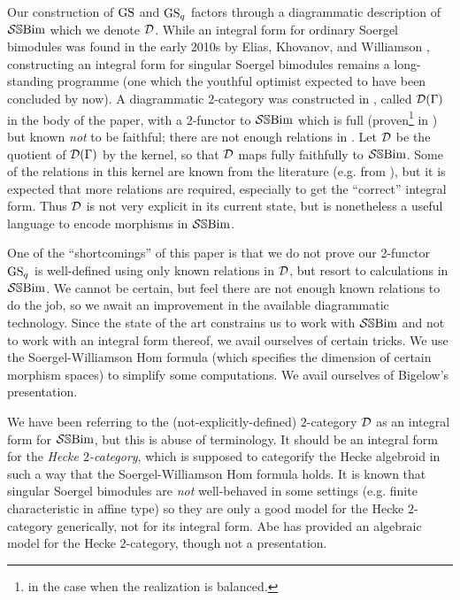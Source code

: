 Our construction of $\operatorname{GS}$ and $\operatorname{GS}_q$ factors through a diagrammatic description of $\mathcal{S}\mathbb{S}\text{Bim}$ which we denote $\mathcal{D}$. While an integral form for ordinary Soergel bimodules was found in the early 2010s by Elias, Khovanov, and Williamson \cite{EKho, ECathedral, EWGr4sb}, constructing an integral form for singular Soergel bimodules remains a long-standing programme (one which the youthful optimist expected to have been concluded by now). 
A diagrammatic $2$-category was constructed in \cite{EWSFrob}, called $\mathcal{D}(\Gamma)$ in the body of the paper, with a 2-functor to $\mathcal{S}\mathbb{S}\text{Bim}$ which is full (proven\footnote{in the case when the realization is balanced.}  in \cite{EKLP}) but known \emph{not} to be faithful; there are not enough relations in \cite{EWSFrob}. Let $\mathcal{D}$ be the quotient of $\mathcal{D}(\Gamma)$ by the kernel, so that $\mathcal{D}$ maps fully faithfully to $\mathcal{S}\mathbb{S}\text{Bim}$. Some of the relations in this kernel are known from the literature (e.g. from \cite{ECathedral, ELosev}), but it is expected that more relations are required, especially to get the ``correct'' integral form. Thus $\mathcal{D}$ is not very explicit in its current state, but is nonetheless a useful language to encode morphisms in $\mathcal{S}\mathbb{S}\text{Bim}$.

One of the ``shortcomings'' of this paper is that we do not prove our 2-functor $\operatorname{GS}_q$ is well-defined using only known relations in $\mathcal{D}$, but resort to calculations in $\mathcal{S}\mathbb{S}\text{Bim}$. We cannot be certain, but feel there are not enough known relations to do the job, so we await an improvement in the available diagrammatic technology. Since the state of the art constrains us to work with $\mathcal{S}\mathbb{S}\text{Bim}$ and not to work with an integral form thereof, we avail ourselves of certain tricks. We use the Soergel-Williamson Hom formula (which specifies the dimension of certain morphism spaces) to simplify some computations. We avail ourselves of Bigelow's presentation.

We have been referring to the (not-explicitly-defined) $2$-category $\mathcal{D}$ as an integral form for $\mathcal{S}\mathbb{S}\text{Bim}$, but this is abuse of terminology. It should be an integral form for the \emph{Hecke $2$-category}, which is supposed to categorify the Hecke algebroid in such a way that the Soergel-Williamson Hom formula holds. It is known that singular Soergel bimodules are \emph{not} well-behaved in some settings (e.g. finite characteristic in affine type) so they are only a good model for the Hecke $2$-category generically, not for its integral form. Abe \cite{Abe} has provided an algebraic model for the Hecke $2$-category, though not a presentation.

